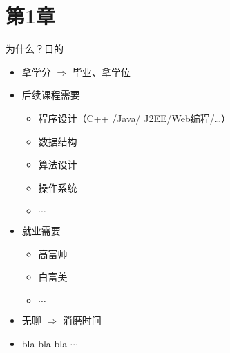 \section[第1章]{第1章}
\begin{frame}{为什么？}{目的}  
  \begin{itemize}
  \item { 拿学分 $\Rightarrow$ 毕业、拿\alert{学位}}
  \item { 后续课程需要}
    \begin{itemize}
    \item 程序设计（C++ /Java/ J2EE/Web编程/\dots）
    \item \alert{数据结构}
    \item 算法设计
    \item 操作系统
    \item $\cdots$
    \end{itemize}
  \item { 就业需要}
    \begin{itemize}
    \item 高富帅
    \item 白富美
    \item $\cdots$
    \end{itemize}
  \item { 无聊 $\Rightarrow$ 消磨时间}  
  \item { bla bla bla $\cdots$}             
  \end{itemize}
\end{frame}


